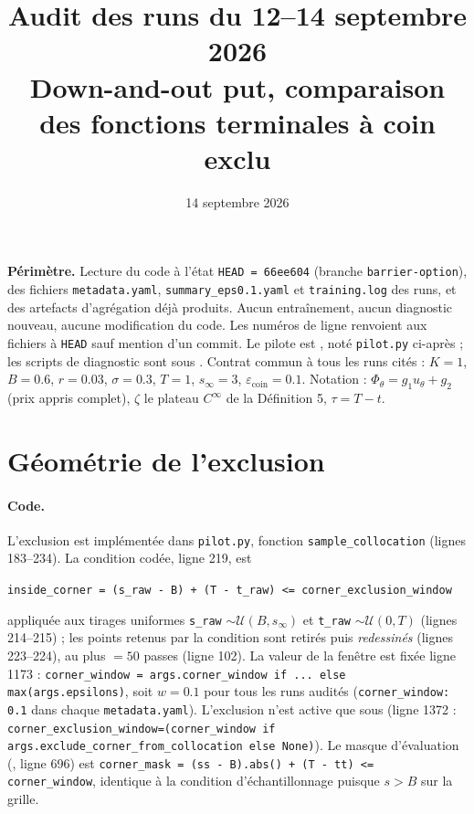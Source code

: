 \documentclass[11pt]{article}
\title{Audit des runs du 12--14 septembre 2026\\
\large Down-and-out put, comparaison des fonctions terminales à coin exclu}
\author{}
\date{14 septembre 2026}
\newcommand{\epscoin}{\varepsilon_{\mathrm{coin}}}
\newcommand{\code}[1]{\texttt{#1}}
\begin{document}
\maketitle

\noindent\textbf{Périmètre.} Lecture du code à l'état \code{HEAD = 66ee604}
(branche \code{barrier-option}), des fichiers \code{metadata.yaml},
\code{summary\_eps0.1.yaml} et \code{training.log} des runs, et des artefacts
d'agrégation déjà produits. Aucun entraînement, aucun diagnostic nouveau,
aucune modification du code. Les numéros de ligne renvoient aux fichiers à
\code{HEAD} sauf mention d'un commit. Le pilote est
,
noté \code{pilot.py} ci-après ; les scripts de diagnostic sont sous
.
Contrat commun à tous les runs cités : $K=1$, $B=0.6$, $r=0.03$, $\sigma=0.3$,
$T=1$, $s_\infty=3$, $\epscoin=0.1$. Notation : $\Phi_\theta=g_1u_\theta+g_2$
(prix appris complet), $\zeta$ le plateau $C^\infty$ de la Définition 5,
$\tau=T-t$.

\section{Géométrie de l'exclusion}
\label{sec:exclusion}

\paragraph{Code.} L'exclusion est implémentée dans \code{pilot.py},
fonction \code{sample\_collocation} (lignes 183--234). La condition codée,
ligne 219, est
\begin{center}
\code{inside\_corner = (s\_raw - B) + (T - t\_raw) <= corner\_exclusion\_window}
\end{center}
appliquée aux tirages uniformes \code{s\_raw} $\sim\mathcal U(B,s_\infty)$ et
\code{t\_raw} $\sim\mathcal U(0,T)$ (lignes 214--215) ; les points retenus par
la condition sont retirés puis \emph{redessinés} (lignes 223--224), au plus
 $=50$ passes (ligne 102). La valeur
de la fenêtre est fixée ligne 1173 :
\code{corner\_window = args.corner\_window if ... else max(args.epsilons)}, soit
$w=0.1$ pour tous les runs audités (\code{corner\_window: 0.1} dans chaque
\code{metadata.yaml}). L'exclusion n'est active que sous
 (ligne 1372 :
\code{corner\_exclusion\_window=(corner\_window if args.exclude\_corner\_from\_collocation else None)}).
Le masque d'évaluation (, ligne 696) est
\code{corner\_mask = (ss - B).abs() + (T - tt) <= corner\_window}, identique à
la condition d'échantillonnage puisque $s>B$ sur la grille.
\end{document}
